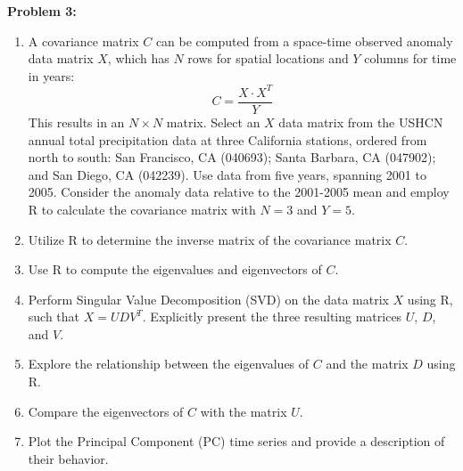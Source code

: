 \documentclass[12pt]{article}
\newenvironment{problem}[1]{
    \textbf{Problem #1:}
}{
    \rmfamily \vspace{1em}
}
\begin{document}
\begin{problem}{3}
    \begin{enumerate}[label=(\alph*)]
        \item A covariance matrix \( C \) can be computed from a space-time observed anomaly data matrix \( X \), which has \( N \) rows for spatial locations and \( Y \) columns for time in years:
        \[
            C = \frac{X \cdot X^T}{Y}
        \]
        This results in an \( N \times N \) matrix. Select an \( X \) data matrix from the USHCN annual total precipitation data at three California stations, ordered from north to south: San Francisco, CA (040693); Santa Barbara, CA (047902); and San Diego, CA (042239). Use data from five years, spanning 2001 to 2005. Consider the anomaly data relative to the 2001-2005 mean and employ R to calculate the covariance matrix with \( N = 3 \) and \( Y = 5 \).

        \item Utilize R to determine the inverse matrix of the covariance matrix \( C \).

        \item Use R to compute the eigenvalues and eigenvectors of \( C \).

        \item Perform Singular Value Decomposition (SVD) on the data matrix \( X \) using R, such that \( X = UDV^T \). Explicitly present the three resulting matrices \( U \), \( D \), and \( V \).

        \item Explore the relationship between the eigenvalues of \( C \) and the matrix \( D \) using R.

        \item Compare the eigenvectors of \( C \) with the matrix \( U \).

        \item Plot the Principal Component (PC) time series and provide a description of their behavior.
    \end{enumerate}
\end{problem}
\end{document}
